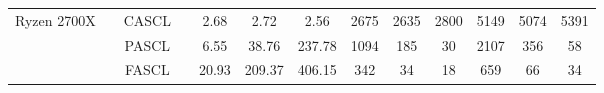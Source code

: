 \documentclass[11pt]{report}
\begin{document}
\begin{table}[h]
{{\begin{tabular}{r|c|c|c c c c| c c c| c c c}
        \hline
        \multirow{3}{*}{\begin{minipage}{0.5in}\centering Ryzen 2700X\end{minipage}} & \multirow{3}{*}{\begin{minipage}{0.5in}\centering 4230\end{minipage}}
                                                                                     & CASCL                                                                                 &                                            & 2.68 & 2.72                                                      & 2.56                                              & 2675                                                       & 2635         & 2800         & 5149         & 5074         & 5391                        \\
                                                                                     &                                                                                       & PASCL                                      &      & 6.55                                                      & 38.76                                             & 237.78                                                     & 1094         & 185          & 30           & 2107         & 356          & 58           \\
                                                                                     &                                                                                       & FASCL                                      &      & 20.93                                                     & 209.37                                            & 406.15                                                     & 342          & 34           & 18           & 659          & 66           & 34           \\


\end{tabular}}}
\end{table}
\end{document}
